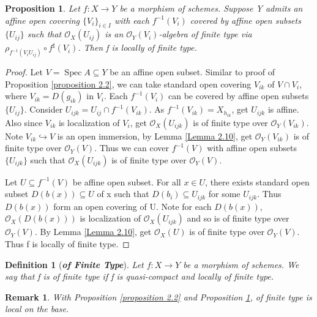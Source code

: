 \documentclass{ctexart}
\newtheorem{definition}{Definition}[section]
\newtheorem{remark}{Remark}[section]
\newtheorem{proposition}{Proposition}[section]
\newcommand{\spec}{\operatorname{Spec}}
\begin{document}
\begin{proposition}
    Let $f: X \longrightarrow Y$ be a morphism of schemes.
    Suppose Y admits an affine open covering $\{V_{i}\}_{i\in I}$ with each $f^{-1}(V_{i})$ covered by affine open subsets $\{U_{ij}\}$ such that $\mathcal{O}_{X}(U_{ij})$ is an $\mathcal{O}_{Y}(V_{i})$-algebra of finite type via $\rho_{f^{-1}(V_{i}U_{ij})} \circ f^{\sharp}(V_{i})$.
    Then f is locally of finite type.
    \label{Proposition 2.3}
\end{proposition}
\begin{proof}
    Let $V = \spec A \subseteq Y$ be an affine open subset.
    Similar to proof of Proposition \ref{proposition 2.2}, we can take standard open covering ${V_{ik}}$ of $V \cap V_{i}$, where $V_{ik} = D(g_{ik})$ in $V_{i}$.
    Each $f^{-1}(V_{i})$ can be covered by affine open subsets $\{U_{ij}\}$.
    Consider $U_{ijk} = U_{ij} \cap f^{-1}(V_{ik})$.
    As $f^{-1}(V_{ik}) = X_{h_{ik}}$, get $U_{ijk}$ is affine.
    Also since $V_{ik}$ is localization of $V_{i}$, get $\mathcal{O}_{X}(U_{ijk})$ is of finite type over $\mathcal{O}_{Y}(V_{ik})$.
    Note $V_{ik} \hookrightarrow V$ is an open immersion, by Lemma \ref{Lemma 2.10}, get $\mathcal{O}_{Y}(V_{ik})$ is of finite type over $\mathcal{O}_{Y}(V)$.
    Thus we can cover $f^{-1}(V)$ with affine open subsets $\{U_{ijk}\}$ such that $\mathcal{O}_{X}(U_{ijk})$ is of finite type over $\mathcal{O}_{Y}(V)$.
    \par
    Let $U \subseteq f^{-1}(V)$ be affine open subset.
    For all $x\in U$, there exists standard open subset $D(b(x)) \subseteq U$ of x such that $D(b_{i}) \subseteq U_{ijk}$ for some $U_{ijk}$.
    Thus $D(b(x))$ form an open covering of U.
    Note for each $D(b(x))$, $\mathcal{O}_{X}(D(b(x)))$ is localization of $\mathcal{O}_{X}(U_{ijk})$ and so is of finite type over $\mathcal{O}_{Y}(V)$.
    By Lemma \ref{Lemma 2.10}, get $\mathcal{O}_{X}(U)$ is of finite type over $\mathcal{O}_{Y}(V)$.
    Thus f is locally of finite type.
\end{proof}
\begin{definition}[\textbf{\emph{of Finite Type}}]
    Let $f: X \longrightarrow Y$ be a morphism of schemes.
    We say that f is of finite type if f is quasi-compact and locally of finite type.
\end{definition}
\begin{remark}
    With Proposition \ref{proposition 2.2} and Proposition \ref{Proposition 2.3}, of finite type is local on the base.
\end{remark}
\end{document}

